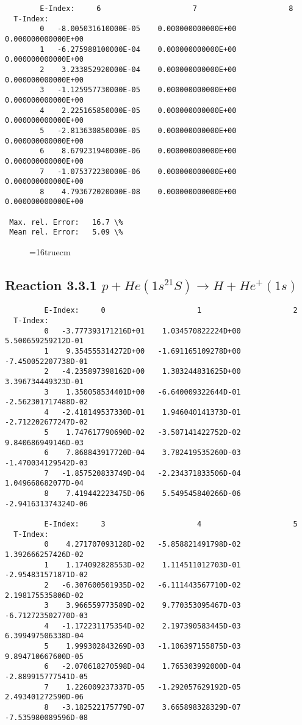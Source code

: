 \documentclass[12pt,dvipdfmx]{article}
\begin{document}
{\begin{small}
\begin{verbatim}
        E-Index:     6                     7                     8
  T-Index:
        0   -8.005031610000E-05    0.000000000000E+00    0.000000000000E+00
        1   -6.275988100000E-04    0.000000000000E+00    0.000000000000E+00
        2    3.233852920000E-04    0.000000000000E+00    0.000000000000E+00
        3   -1.125957730000E-05    0.000000000000E+00    0.000000000000E+00
        4    2.225165850000E-05    0.000000000000E+00    0.000000000000E+00
        5   -2.813630850000E-05    0.000000000000E+00    0.000000000000E+00
        6    8.679231940000E-06    0.000000000000E+00    0.000000000000E+00
        7   -1.075372230000E-06    0.000000000000E+00    0.000000000000E+00
        8    4.793672020000E-08    0.000000000000E+00    0.000000000000E+00

 Max. rel. Error:   16.7 \%
 Mean rel. Error:   5.09 \%
\end{verbatim}\end{small}

\begin{figure} \label{3.2.3b}
\epsfxsize=16truecm
\end{figure}
\newpage


\subsection{
Reaction 3.3.1  $  p + He(1s^21S) \rightarrow H + He^+(1s)  $
}


\begin{small}\begin{verbatim}
         E-Index:     0                     1                     2
  T-Index:
         0   -3.777393171216D+01    1.034570822224D+00    5.500659259212D-01
         1    9.354555314272D+00   -1.691165109278D+00   -7.450052207738D-01
         2   -4.235897398162D+00    1.383244831625D+00    3.396734449323D-01
         3    1.350058534401D+00   -6.640009322644D-01   -2.562301717488D-02
         4   -2.418149537330D-01    1.946040141373D-01   -2.712202677247D-02
         5    1.747617790690D-02   -3.507141422752D-02    9.840686949146D-03
         6    7.868843917720D-04    3.782419535260D-03   -1.470034129542D-03
         7   -1.857520833749D-04   -2.234371833506D-04    1.049668682077D-04
         8    7.419442223475D-06    5.549545840266D-06   -2.941631374324D-06

         E-Index:     3                     4                     5
  T-Index:
         0    4.271707093128D-02   -5.858821491798D-02    1.392666257426D-02
         1    1.174092828553D-02    1.114511012703D-01   -2.954831571871D-02
         2   -6.307600501935D-02   -6.111443567710D-02    2.198175535806D-02
         3    3.966559773589D-02    9.770353095467D-03   -6.712723502770D-03
         4   -1.172231175354D-02    2.197390583445D-03    6.399497506338D-04
         5    1.999302843269D-03   -1.106397155875D-03    9.894710667600D-05
         6   -2.070618270598D-04    1.765303992000D-04   -2.889915777541D-05
         7    1.226009237337D-05   -1.292057629192D-05    2.493401272590D-06
         8   -3.182522175779D-07    3.665898328329D-07   -7.535980089596D-08


\end{verbatim}
\end{small}}
\end{document}
